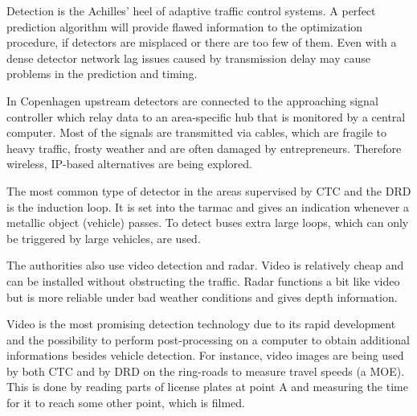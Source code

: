 \label{detection}
Detection is the Achilles' heel of adaptive traffic control systems. A perfect prediction algorithm will provide flawed information to the optimization procedure, if detectors are misplaced or there are too few of them. Even with a dense detector network lag issues caused by transmission delay may cause problems in the prediction and timing.

In Copenhagen upstream detectors are connected to the approaching signal controller which relay data to an area-specific hub that is monitored by a central computer. Most of the signals are transmitted via cables, which are fragile to heavy traffic, frosty weather and are often damaged by entrepreneurs. Therefore wireless, IP-based alternatives are being explored.

The most common type of detector in the areas supervised by CTC and the DRD is the induction loop. It is set into the tarmac and gives an indication whenever a metallic object (vehicle) passes. To detect buses extra large loops, which can only be triggered by large vehicles, are used. 

The authorities also use video detection and radar. Video is relatively cheap and can be installed without obstructing the traffic. Radar functions a bit like video but is more reliable under bad weather conditions and gives depth information.

Video is the most promising detection technology due to its rapid development and the possibility to perform post-processing on a computer to obtain additional informations besides vehicle detection. For instance, video images are being used by both CTC and by DRD on the ring-roads to measure travel speeds (a MOE). This is done by reading parts of license plates at point A and measuring the time for it to reach some other point, which is filmed.